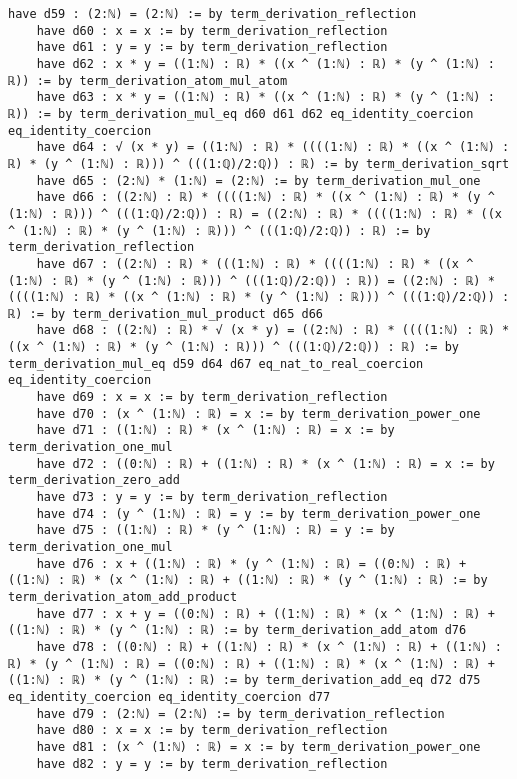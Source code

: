 \documentclass{article}
\begin{document}
\begin{tcolorbox}[colback=white!10, width=\linewidth]
\begin{lstlisting}[language=Lean4]
    have d59 : (2:ℕ) = (2:ℕ) := by term_derivation_reflection
    have d60 : x = x := by term_derivation_reflection
    have d61 : y = y := by term_derivation_reflection
    have d62 : x * y = ((1:ℕ) : ℝ) * ((x ^ (1:ℕ) : ℝ) * (y ^ (1:ℕ) : ℝ)) := by term_derivation_atom_mul_atom
    have d63 : x * y = ((1:ℕ) : ℝ) * ((x ^ (1:ℕ) : ℝ) * (y ^ (1:ℕ) : ℝ)) := by term_derivation_mul_eq d60 d61 d62 eq_identity_coercion eq_identity_coercion
    have d64 : √ (x * y) = ((1:ℕ) : ℝ) * ((((1:ℕ) : ℝ) * ((x ^ (1:ℕ) : ℝ) * (y ^ (1:ℕ) : ℝ))) ^ (((1:ℚ)/2:ℚ)) : ℝ) := by term_derivation_sqrt
    have d65 : (2:ℕ) * (1:ℕ) = (2:ℕ) := by term_derivation_mul_one
    have d66 : ((2:ℕ) : ℝ) * ((((1:ℕ) : ℝ) * ((x ^ (1:ℕ) : ℝ) * (y ^ (1:ℕ) : ℝ))) ^ (((1:ℚ)/2:ℚ)) : ℝ) = ((2:ℕ) : ℝ) * ((((1:ℕ) : ℝ) * ((x ^ (1:ℕ) : ℝ) * (y ^ (1:ℕ) : ℝ))) ^ (((1:ℚ)/2:ℚ)) : ℝ) := by term_derivation_reflection
    have d67 : ((2:ℕ) : ℝ) * (((1:ℕ) : ℝ) * ((((1:ℕ) : ℝ) * ((x ^ (1:ℕ) : ℝ) * (y ^ (1:ℕ) : ℝ))) ^ (((1:ℚ)/2:ℚ)) : ℝ)) = ((2:ℕ) : ℝ) * ((((1:ℕ) : ℝ) * ((x ^ (1:ℕ) : ℝ) * (y ^ (1:ℕ) : ℝ))) ^ (((1:ℚ)/2:ℚ)) : ℝ) := by term_derivation_mul_product d65 d66
    have d68 : ((2:ℕ) : ℝ) * √ (x * y) = ((2:ℕ) : ℝ) * ((((1:ℕ) : ℝ) * ((x ^ (1:ℕ) : ℝ) * (y ^ (1:ℕ) : ℝ))) ^ (((1:ℚ)/2:ℚ)) : ℝ) := by term_derivation_mul_eq d59 d64 d67 eq_nat_to_real_coercion eq_identity_coercion
    have d69 : x = x := by term_derivation_reflection
    have d70 : (x ^ (1:ℕ) : ℝ) = x := by term_derivation_power_one
    have d71 : ((1:ℕ) : ℝ) * (x ^ (1:ℕ) : ℝ) = x := by term_derivation_one_mul
    have d72 : ((0:ℕ) : ℝ) + ((1:ℕ) : ℝ) * (x ^ (1:ℕ) : ℝ) = x := by term_derivation_zero_add
    have d73 : y = y := by term_derivation_reflection
    have d74 : (y ^ (1:ℕ) : ℝ) = y := by term_derivation_power_one
    have d75 : ((1:ℕ) : ℝ) * (y ^ (1:ℕ) : ℝ) = y := by term_derivation_one_mul
    have d76 : x + ((1:ℕ) : ℝ) * (y ^ (1:ℕ) : ℝ) = ((0:ℕ) : ℝ) + ((1:ℕ) : ℝ) * (x ^ (1:ℕ) : ℝ) + ((1:ℕ) : ℝ) * (y ^ (1:ℕ) : ℝ) := by term_derivation_atom_add_product
    have d77 : x + y = ((0:ℕ) : ℝ) + ((1:ℕ) : ℝ) * (x ^ (1:ℕ) : ℝ) + ((1:ℕ) : ℝ) * (y ^ (1:ℕ) : ℝ) := by term_derivation_add_atom d76
    have d78 : ((0:ℕ) : ℝ) + ((1:ℕ) : ℝ) * (x ^ (1:ℕ) : ℝ) + ((1:ℕ) : ℝ) * (y ^ (1:ℕ) : ℝ) = ((0:ℕ) : ℝ) + ((1:ℕ) : ℝ) * (x ^ (1:ℕ) : ℝ) + ((1:ℕ) : ℝ) * (y ^ (1:ℕ) : ℝ) := by term_derivation_add_eq d72 d75 eq_identity_coercion eq_identity_coercion d77
    have d79 : (2:ℕ) = (2:ℕ) := by term_derivation_reflection
    have d80 : x = x := by term_derivation_reflection
    have d81 : (x ^ (1:ℕ) : ℝ) = x := by term_derivation_power_one
    have d82 : y = y := by term_derivation_reflection

\end{lstlisting}
\end{tcolorbox}
\end{document}
